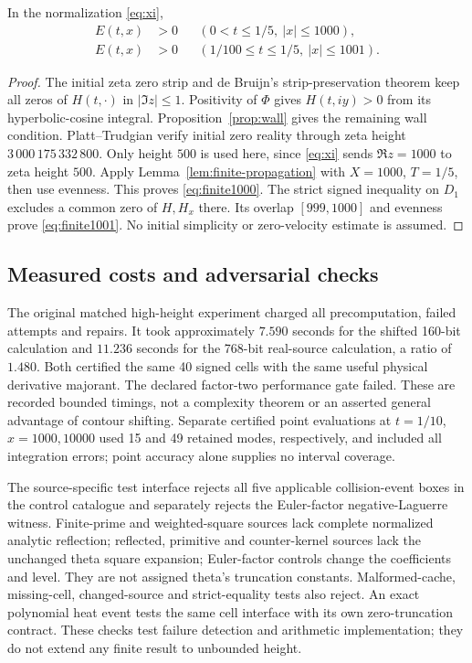 \begin{theorem}\label{thm:finite-height}
In the normalization \eqref{eq:xi},
\begin{align}
 E(t,x)&>0&& (0<t\le1/5,\ |x|\le1000),\label{eq:finite1000}\\
 E(t,x)&>0&& (1/100\le t\le1/5,\ |x|\le1001).\label{eq:finite1001}
\end{align}
\end{theorem}
\begin{proof}
The initial zeta zero strip and de Bruijn's strip-preservation theorem
\cite[Theorem 3.2]{Polymath} keep all zeros of $H(t,\cdot)$
in $|\Im z|\le1$. Positivity of $\Phi$ gives $H(t,iy)>0$
from its hyperbolic-cosine integral. Proposition~\ref{prop:wall}
gives the remaining wall condition.
Platt--Trudgian \cite[Theorem 1]{PlattTrudgian} verify initial
zero reality through zeta height $3\,000\,175\,332\,800$.
Only height $500$ is used here, since \eqref{eq:xi} sends
$\Re z=1000$ to zeta height $500$.
Apply Lemma~\ref{lem:finite-propagation} with $X=1000$, $T=1/5$,
then use evenness. This proves \eqref{eq:finite1000}.
The strict signed inequality on $D_1$ excludes a common zero
of $H,H_x$ there. Its overlap $[999,1000]$ and evenness prove
\eqref{eq:finite1001}. No initial simplicity or zero-velocity
estimate is assumed.
\end{proof}

\subsection{Measured costs and adversarial checks}

The original matched high-height experiment charged all precomputation,
failed attempts and repairs. It took approximately $7.590$ seconds
for the shifted 160-bit calculation and $11.236$ seconds for the
768-bit real-source calculation, a ratio of $1.480$.
Both certified the same 40 signed cells with the same useful
physical derivative majorant. The declared factor-two performance
gate failed. These are recorded bounded timings, not a complexity
theorem or an asserted general advantage of contour shifting.
Separate certified point evaluations at $t=1/10$, $x=1000,10000$
used 15 and 49 retained modes, respectively, and included all
integration errors; point accuracy alone supplies no interval coverage.

The source-specific test interface rejects all five applicable
collision-event boxes in the control catalogue and separately rejects
the Euler-factor negative-Laguerre witness. Finite-prime and
weighted-square sources lack complete normalized analytic reflection;
reflected, primitive and counter-kernel sources lack the unchanged
theta square expansion; Euler-factor controls change the coefficients
and level. They are not assigned theta's truncation constants.
Malformed-cache, missing-cell, changed-source and strict-equality
tests also reject. An exact polynomial heat event tests the same
cell interface with its own zero-truncation contract.
These checks test failure detection and arithmetic implementation;
they do not extend any finite result to unbounded height.
